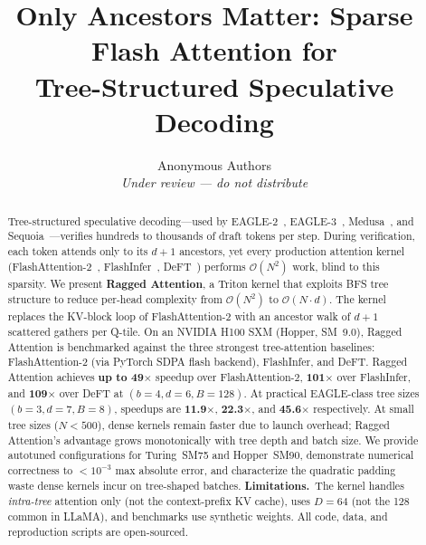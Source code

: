 \documentclass{article}
\title{%
  \textbf{Only Ancestors Matter: Sparse Flash Attention for \\
  Tree-Structured Speculative Decoding}%
}
\author{
  Anonymous Authors \\
  \textit{Under review — do not distribute}
}
\date{}
\newcommand{\method}{Ragged Attention}
\newcommand{\bigO}[1]{\mathcal{O}(#1)}
\newcommand{\numtokens}{N}
\newcommand{\depth}{d}
\newcommand{\branching}{b}
\newcommand{\headdim}{D}
\newcommand{\batchsize}{B}
\begin{document}
\maketitle

\begin{abstract}
Tree-structured speculative decoding---used by
EAGLE-2~\cite{li2024eagle2}, EAGLE-3~\cite{li2025eagle3},
Medusa~\cite{cai2024medusa}, and Sequoia~\cite{chen2024sequoia}---verifies
hundreds to thousands of draft tokens per step.
During verification, each token attends only to its
$\depth{+}1$ ancestors, yet every production attention kernel
(FlashAttention-2~\cite{dao2023flashattention2},
FlashInfer~\cite{ye2025flashinfer}, DeFT~\cite{yao2024deft})
performs $\bigO{\numtokens^2}$ work, blind to this sparsity.
We present \textbf{\method{}}, a Triton kernel that
exploits BFS tree structure to reduce per-head complexity from
$\bigO{\numtokens^2}$ to $\bigO{\numtokens \cdot \depth}$.
The kernel replaces the KV-block loop of FlashAttention-2
with an ancestor walk of $\depth{+}1$ scattered gathers per Q-tile.
On an NVIDIA H100 SXM (Hopper, SM~9.0), \method{} is benchmarked
against the three strongest tree-attention baselines:
FlashAttention-2 (via PyTorch SDPA flash backend),
FlashInfer, and DeFT.
\method{} achieves \textbf{up to 49$\boldsymbol{\times}$} speedup
over FlashAttention-2,
\textbf{101$\boldsymbol{\times}$} over FlashInfer, and
\textbf{109$\boldsymbol{\times}$} over DeFT
at $(\branching{=}4, \depth{=}6, \batchsize{=}128)$.
At practical EAGLE-class tree sizes
$(\branching{=}3, \depth{=}7, \batchsize{=}8)$,
speedups are \textbf{11.9$\boldsymbol{\times}$},
\textbf{22.3$\boldsymbol{\times}$}, and
\textbf{45.6$\boldsymbol{\times}$} respectively.
At small tree sizes ($\numtokens < 500$), dense kernels remain faster
due to launch overhead; \method{}'s advantage grows monotonically
with tree depth and batch size.
We provide autotuned configurations for Turing~SM75 and Hopper~SM90,
demonstrate numerical correctness to $<10^{-3}$ max absolute error,
and characterize the quadratic padding waste dense kernels incur on
tree-shaped batches.
\textbf{Limitations.}\
The kernel handles \emph{intra-tree} attention only (not the context-prefix
KV cache), uses $\headdim{=}64$ (not the 128 common in LLaMA),
and benchmarks use synthetic weights.
All code, data, and reproduction scripts are open-sourced.
\end{abstract}
\end{document}
